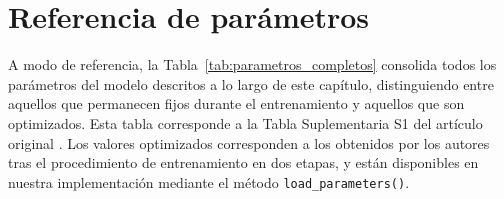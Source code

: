\section{Referencia de parámetros}
\label{sec:impl_parametros}

A modo de referencia, la Tabla~\ref{tab:parametros_completos} consolida todos los parámetros del modelo descritos a lo largo de este capítulo, distinguiendo entre aquellos que permanecen fijos durante el entrenamiento y aquellos que son optimizados. Esta tabla corresponde a la Tabla Suplementaria S1 del artículo original \citep{echeveste2020cortical}. Los valores optimizados corresponden a los obtenidos por los autores tras el procedimiento de entrenamiento en dos etapas, y están disponibles en nuestra implementación mediante el método \texttt{load\_parameters()}.


